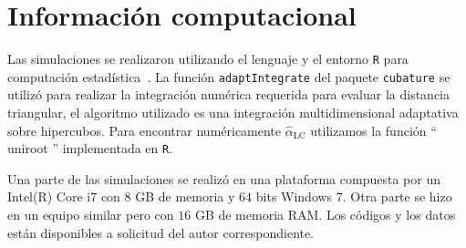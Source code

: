\chapter{Información computacional}


Las simulaciones se realizaron utilizando el lenguaje y el entorno \texttt R para computación estadística~\cite{RLanguage}.
La función \texttt{adaptIntegrate} del paquete \texttt{cubature} se utilizó para realizar la integración numérica requerida para evaluar la distancia triangular, el algoritmo utilizado es una integración multidimensional adaptativa sobre hipercubos. Para encontrar numéricamente $\widehat\alpha_{\text{LC}}$ utilizamos la función `` uniroot '' implementada en \texttt R.

Una parte de las simulaciones se realizó en una plataforma compuesta por un Intel(R) Core i7 con $8$ GB de memoria y $64$ bits  Windows  7. Otra parte se hizo en un equipo similar pero con $16$ GB de memoria RAM.
Los códigos y los datos están disponibles a solicitud del autor correspondiente.